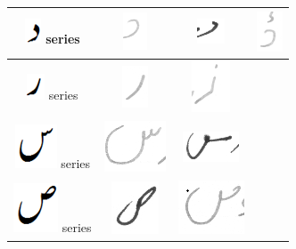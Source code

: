 \begin{table}[h]
\begin{tabular}{@{}cccc@{}}
\hline
\includegraphics[scale=0.25]{daal_orig} series & \includegraphics[scale=0.15]{89} & \includegraphics[scale=0.15]{90}  & \includegraphics[scale=0.15]{91} \\
\hline
\includegraphics[scale=0.25]{re_orig} series & \includegraphics[scale=0.15]{92} & \includegraphics[scale=0.15]{93}  &  \\
\hline
\includegraphics[scale=0.25]{seen_orig} series & \includegraphics[scale=0.15]{94} & \includegraphics[scale=0.15]{95}  &  \\
\hline
\includegraphics[scale=0.20]{suad_orig} series & \includegraphics[scale=0.15]{96} & \includegraphics[scale=0.15]{97}  &  \\

\end{tabular}
\end{table}
